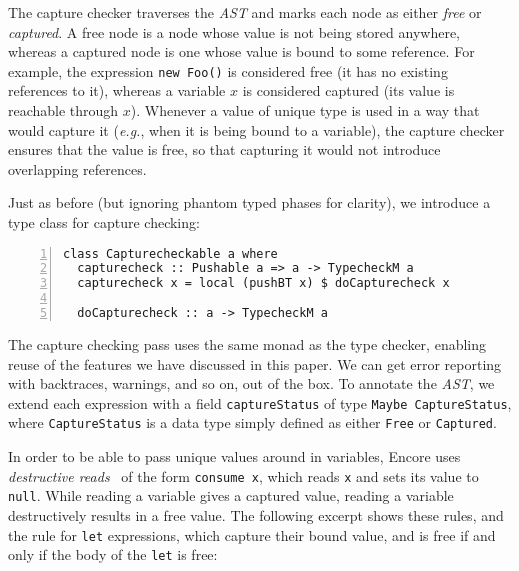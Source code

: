 \documentclass[sigplan,screen]{acmart}
\makeatletter
\newcommand{\ec}[1]{\lstinline[style=encore,breaklines=true,basicstyle=\fontsize{9}{9}\tt]@#1@}
\newcommand{\astt}[0]{\textit{AST}}
\makeatother
\begin{document}
The capture checker traverses the \astt{} and marks each node as
either \emph{free} or \emph{captured}. A free node is a node whose
value is not being stored anywhere, whereas a captured node is one
whose value is bound to some reference. For example, the
expression \ec{new Foo()} is considered free (it has no existing
references to it), whereas a variable $x$ is considered captured
(its value is reachable through $x$). Whenever a value of unique
type is used in a way that would capture it (\emph{e.g.}, when it
is being bound to a variable), the capture checker ensures that
the value is free, so that capturing it would not introduce
overlapping references.

Just as before (but ignoring phantom typed phases for clarity), we
introduce a type class for capture checking:

\begin{minipage}[t]{.80\linewidth}
\begin{lstlisting}[style=encore,numbers=left]
class Capturecheckable a where
  capturecheck :: Pushable a => a -> TypecheckM a
  capturecheck x = local (pushBT x) $ doCapturecheck x

  doCapturecheck :: a -> TypecheckM a
\end{lstlisting}
\end{minipage}

The capture checking pass uses the same monad as the type checker,
enabling reuse of the features we have discussed in this paper. We
can get error reporting with backtraces, warnings, and so on, out
of the box.
%
To annotate the \astt{}, we extend each expression with a field
\ec{captureStatus} of type \ec{Maybe CaptureStatus}, where
\ec{CaptureStatus} is a data type simply defined as either
\ec{Free} or \ec{Captured}.

In order to be able to pass unique values around in variables,
Encore uses \emph{destructive reads}~\cite{destructive} of the
form \ec{consume x}, which reads \ec{x} and sets its value to
\ec{null}. While reading a variable gives a captured value,
reading a variable destructively results in a free value.
%
The following excerpt shows these rules, and the rule for \ec{let}
expressions, which capture their bound value, and is free if and
only if the body of the \ec{let} is free:
\end{document}
